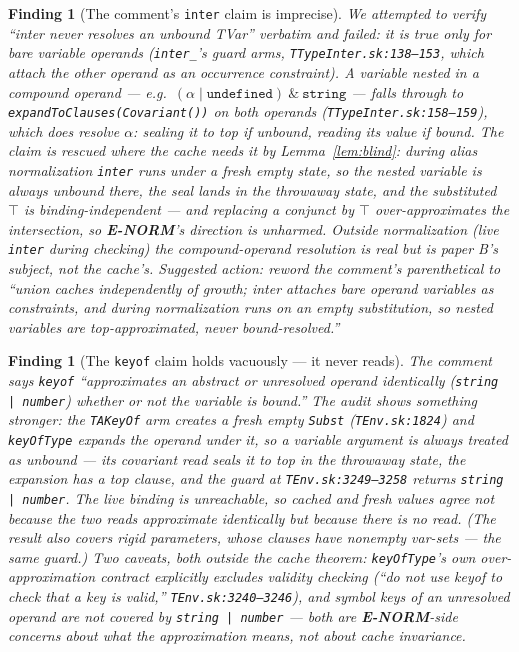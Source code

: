 \documentclass[11pt]{article}
\newtheorem{finding}[theorem]{Finding}
\begin{document}
\begin{finding}[The comment's \texttt{inter} claim is imprecise]
\label{find:inter-comment}
We attempted to verify ``inter never resolves an unbound TVar''
verbatim and \emph{failed}: it is true only for \emph{bare} variable
operands (\texttt{inter\_}'s guard arms, \texttt{TTypeInter.sk:138--153},
which attach the other operand as an occurrence constraint). A variable
nested in a \emph{compound} operand — e.g.\
$(\alpha \mid \texttt{undefined})\ \&\ \texttt{string}$ — falls through
to \texttt{expandToClauses(Covariant())} on both operands
(\texttt{TTypeInter.sk:158--159}), which \emph{does} resolve $\alpha$:
sealing it to top if unbound, reading its value if bound. The claim is
rescued where the cache needs it by Lemma~\ref{lem:blind}: during alias
normalization \texttt{inter} runs under a fresh \emph{empty} state, so
the nested variable is always unbound there, the seal lands in the
throwaway state, and the substituted $\top$ is binding-independent —
and replacing a conjunct by $\top$ over-approximates the intersection,
so \textbf{E-NORM}'s direction is unharmed. Outside normalization (live
\texttt{inter} during checking) the compound-operand resolution is real
but is paper B's subject, not the cache's. Suggested action: reword the
comment's parenthetical to ``union caches independently of growth;
inter attaches \emph{bare} operand variables as constraints, and during
normalization runs on an empty substitution, so nested variables are
top-approximated, never bound-resolved.''
\end{finding}

\begin{finding}[The \texttt{keyof} claim holds vacuously — it never
reads]
\label{find:keyof}
The comment says \texttt{keyof} ``approximates an abstract or
unresolved operand identically (\texttt{string | number}) whether or not
the variable is bound.'' The audit shows something stronger: the
\texttt{TAKeyOf} arm creates a fresh \emph{empty} \texttt{Subst}
(\texttt{TEnv.sk:1824}) and \texttt{keyOfType} expands the operand under
it, so a variable argument is \emph{always} treated as unbound — its
covariant read seals it to top in the throwaway state, the expansion has
a top clause, and the guard at \texttt{TEnv.sk:3249--3258} returns
\texttt{string | number}. The live binding is unreachable, so cached and
fresh values agree not because the two reads approximate identically but
because there is no read. (The result also covers rigid parameters,
whose clauses have nonempty var-sets — the same guard.) Two caveats,
both outside the cache theorem: \texttt{keyOfType}'s own
over-approximation contract explicitly excludes validity checking
(``do not use keyof to check that a key is valid,''
\texttt{TEnv.sk:3240--3246}), and symbol keys of an unresolved operand
are not covered by \texttt{string | number} — both are
\textbf{E-NORM}-side concerns about what the approximation means, not
about cache invariance.
\end{finding}
\end{document}
